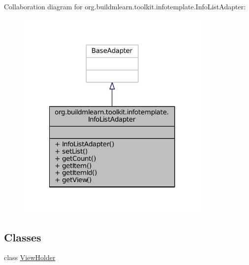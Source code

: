 Collaboration diagram for org.\-buildmlearn.\-toolkit.\-infotemplate.\-Info\-List\-Adapter\-:
\nopagebreak
\begin{figure}[H]
\begin{center}
\leavevmode
\includegraphics[width=270pt]{dc/d24/classorg_1_1buildmlearn_1_1toolkit_1_1infotemplate_1_1InfoListAdapter__coll__graph}
\end{center}
\end{figure}
\subsection*{Classes}
\begin{DoxyCompactItemize}
\item 
class \hyperlink{classorg_1_1buildmlearn_1_1toolkit_1_1infotemplate_1_1InfoListAdapter_1_1ViewHolder}{View\-Holder}
\end{DoxyCompactItemize}

